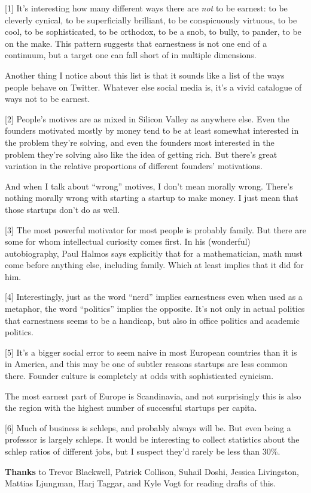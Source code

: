 {[}1{]} It's interesting how many different ways there are \emph{not} to
be earnest: to be cleverly cynical, to be superficially brilliant, to be
conspicuously virtuous, to be cool, to be sophisticated, to be orthodox,
to be a snob, to bully, to pander, to be on the make. This pattern
suggests that earnestness is not one end of a continuum, but a target
one can fall short of in multiple dimensions.

Another thing I notice about this list is that it sounds like a list of
the ways people behave on Twitter. Whatever else social media is, it's a
vivid catalogue of ways not to be earnest.

{[}2{]} People's motives are as mixed in Silicon Valley as anywhere
else. Even the founders motivated mostly by money tend to be at least
somewhat interested in the problem they're solving, and even the
founders most interested in the problem they're solving also like the
idea of getting rich. But there's great variation in the relative
proportions of different founders' motivations.

And when I talk about ``wrong'' motives, I don't mean morally wrong.
There's nothing morally wrong with starting a startup to make money. I
just mean that those startups don't do as well.

{[}3{]} The most powerful motivator for most people is probably family.
But there are some for whom intellectual curiosity comes first. In his
(wonderful) autobiography, Paul Halmos says explicitly that for a
mathematician, math must come before anything else, including family.
Which at least implies that it did for him.

{[}4{]} Interestingly, just as the word ``nerd'' implies earnestness
even when used as a metaphor, the word ``politics'' implies the
opposite. It's not only in actual politics that earnestness seems to be
a handicap, but also in office politics and academic politics.

{[}5{]} It's a bigger social error to seem naive in most European
countries than it is in America, and this may be one of subtler reasons
startups are less common there. Founder culture is completely at odds
with sophisticated cynicism.

The most earnest part of Europe is Scandinavia, and not surprisingly
this is also the region with the highest number of successful startups
per capita.

{[}6{]} Much of business is schleps, and probably always will be. But
even being a professor is largely schleps. It would be interesting to
collect statistics about the schlep ratios of different jobs, but I
suspect they'd rarely be less than 30\%.

\textbf{Thanks} to Trevor Blackwell, Patrick Collison, Suhail Doshi,
Jessica Livingston, Mattias Ljungman, Harj Taggar, and Kyle Vogt for
reading drafts of this.

